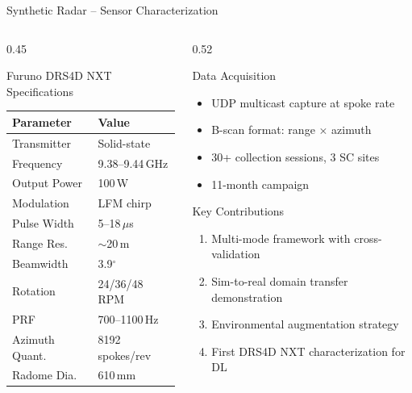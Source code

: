 \documentclass[aspectratio=169, 10pt]{beamer}
\begin{document}
\begin{frame}{Synthetic Radar -- Sensor Characterization}
  \begin{columns}[T]
    \begin{column}{0.45\textwidth}
      \begin{block}{Furuno DRS4D NXT Specifications}
        \centering
        \small
        \renewcommand{\arraystretch}{1.15}
        \begin{tabular}{@{}l l@{}}
          \toprule
          \textbf{Parameter} & \textbf{Value} \\
          \midrule
          Transmitter     & Solid-state \\
          Frequency        & 9.38--9.44\,GHz \\
          Output Power     & 100\,W \\
          Modulation       & LFM chirp \\
          Pulse Width      & 5--18\,$\mu$s \\
          Range Res.       & $\sim$20\,m \\
          Beamwidth        & 3.9$^\circ$ \\
          Rotation         & 24/36/48\,RPM \\
          PRF              & 700--1100\,Hz \\
          Azimuth Quant.   & 8192 spokes/rev \\
          Radome Dia.      & 610\,mm \\
          \bottomrule
        \end{tabular}
      \end{block}
    \end{column}
    \begin{column}{0.52\textwidth}
      \begin{block}{Data Acquisition}
        \begin{itemize}
          \item UDP multicast capture at spoke rate
          \item B-scan format: range $\times$ azimuth
          \item 30+ collection sessions, 3 SC sites
          \item 11-month campaign
        \end{itemize}
      \end{block}
      \vspace{0.3em}
      \begin{block}{Key Contributions}
        \begin{enumerate}
          \item Multi-mode framework with cross-validation
          \item Sim-to-real domain transfer demonstration
          \item Environmental augmentation strategy
          \item First DRS4D NXT characterization for DL
        \end{enumerate}
      \end{block}
    \end{column}
  \end{columns}
\end{frame}
\end{document}

